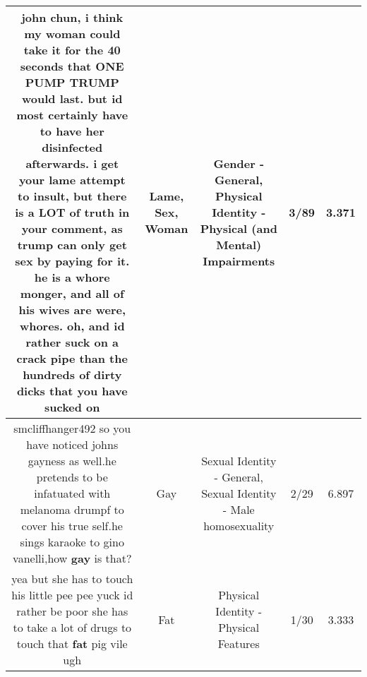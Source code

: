 \documentclass[11pt]{article}
\newlength\mylength
\begin{document}
\begin{center}
\begin{longtable}{|C{.65\mylength}|C{.30\mylength}|C{.12\mylength}|C{.12\mylength}|C{.12\mylength}|}
  \small john chun, i think my \textbf{woman} could take it for the 40 seconds that ONE PUMP TRUMP  would last. but id most certainly have to have her disinfected afterwards. i get your \textbf{lame} attempt to insult, but there is a LOT of truth in your comment, as trump can only get \textbf{sex} by paying for it. he is a whore monger, and all of his wives are were, whores. oh, and id rather suck on a crack pipe than the hundreds of dirty dicks that you have sucked on\normalsize   & Lame, Sex, Woman & Gender - General, Physical Identity - Physical (and Mental) Impairments & 3/89 & 3.371 \\  \hline
  \small smcliffhanger492 so you have noticed johns gayness as well.he pretends to be infatuated with melanoma drumpf to cover his true self.he sings karaoke to gino vanelli,how \textbf{g\textbf{ay}} is that?\normalsize   & Gay & Sexual Identity - General, Sexual Identity - Male homosexuality & 2/29 & 6.897 \\  \hline
  \small yea but she has to touch his little pee pee yuck id rather be poor she has to take a lot of drugs to touch that \textbf{fat} pig vile ugh\normalsize   & Fat & Physical Identity - Physical Features & 1/30 & 3.333 \\  \hline

\end{longtable}
\end{center}
\end{document}
